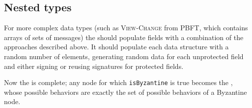 

\subsection{Nested types}
\label{sec:certificate-channels-formalism}
For more complex data types (such as \textsc{View-Change} from PBFT, which contains arrays of sets of messages) the \randomHarness{} should populate fields with a combination of the approaches described above.
It should populate each data structure with a random number of elements, generating random data for each unprotected field and either signing or reusing signatures for protected fields.


Now the \randomHarness{} is complete; any node for which \texttt{isByzantine} is true becomes the \randomSimulator{}, whose possible behaviors are exactly the set of possible behaviors of a Byzantine node.
